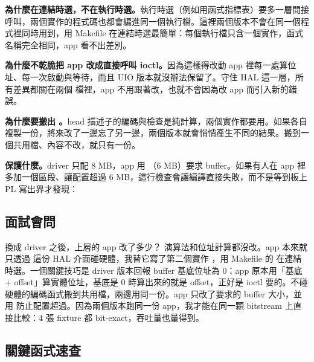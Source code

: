 \textbf{為什麼在連結時選，不在執行時選。}執行時選（例如用函式指標表）要多一層間接呼叫，兩個實作的程式碼也都會編進同一個執行檔。這裡兩個版本不會在同一個程式裡同時用到，用 Makefile 在連結時選最簡單：每個執行檔只含一個實作，函式名稱完全相同，app 看不出差別。

\textbf{為什麼不乾脆把 app 改成直接呼叫 ioctl。}因為這樣得改動 app 裡每一處算位址、每一次啟動與等待，而且 UIO 版本就沒辦法保留了。守住 HAL 這一層，所有差異都關在兩個  檔裡，app 不用跟著改，也就不會因為改 app 而引入新的錯誤。

\textbf{為什麼要搬出 。}head 描述子的編碼與檢查是純計算，兩個實作都要用。如果各自複製一份，將來改了一邊忘了另一邊，兩個版本就會悄悄產生不同的結果。搬到一個共用檔、內容不改，就只有一份。

\textbf{ 保護什麼。}driver 只配 8 MB，app 用 （6 MB）要求 buffer。如果有人在 app 裡多加一個區段、讓配置超過 6 MB，這行檢查會讓編譯直接失敗，而不是等到板上 PL 寫出界才發現：


\subsection{面試會問}

\begin{qa}{換成 driver 之後，上層的 app 改了多少？}
演算法和位址計算都沒改。app 本來就只透過  這份 HAL 介面碰硬體，我替它寫了第二個實作 ，用 Makefile 的  在連結時選。一個關鍵技巧是 driver 版本回報 buffer 基底位址為 0：app 原本用「基底 + offset」算實體位址，基底是 0 時算出來的就是 offset，正好是 ioctl 要的。不碰硬體的編碼函式搬到共用檔，兩邊用同一份。app 只改了要求的 buffer 大小，並用  防止配置超過。因為兩個版本跑同一份 app，我才能在同一顆 bitstream 上直接比較：4 張 fixture 都 bit-exact，吞吐量也量得到。
\end{qa}

\subsection{關鍵函式速查}

